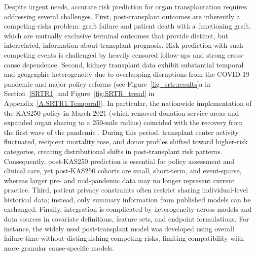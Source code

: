 \documentclass{article}
\theoremstyle{plain}
\theoremstyle{definition}
\theoremstyle{remark}
\begin{document}
Despite urgent needs, accurate risk prediction for organ transplantation requires addressing several challenges. 
First, post-transplant outcomes are inherently a competing-risks problem: graft failure and patient death with a functioning graft, which are mutually exclusive terminal outcomes that provide distinct, but interrelated, information about transplant prognosis. 
Risk prediction with such competing events is challenged by heavily censored follow-ups and strong cross-cause dependence.
Second, kidney transplant data exhibit substantial temporal and geographic heterogeneity due to overlapping disruptions from the COVID-19 pandemic and major policy reforms (see Figure~\ref{fig_srtr:results}a in Section~\ref{SRTR1} and  Figure~\ref{fig:SRTR_trend} in Appendix~\ref{A.SRTR1.Temporal}). 
In particular, the nationwide implementation of the KAS250 policy in March 2021 (which removed donation service areas and expanded organ sharing to a 250-mile radius) coincided with the recovery from the first wave of the pandemic \citep{cron2023increased}. During this period, transplant center activity fluctuated, recipient mortality rose, and donor profiles shifted toward higher-risk categories, creating distributional shifts in post-transplant risk patterns. Consequently, post-KAS250 prediction is essential for policy assessment and clinical care, yet post-KAS250 cohorts are small, short-term, and event-sparse, whereas larger pre- and mid-pandemic data may no longer represent current practice. 
Third, patient privacy constraints often restrict sharing individual-level historical data; instead, only summary information from published models can be exchanged. 
Finally, integration is complicated by heterogeneity across models and data sources in covariate definitions, feature sets, and endpoint formulations. For instance, the widely used post-transplant model \citep{snyder2016developing} was developed using overall failure time without distinguishing competing risks, limiting compatibility with more granular cause-specific models.





\end{document}
